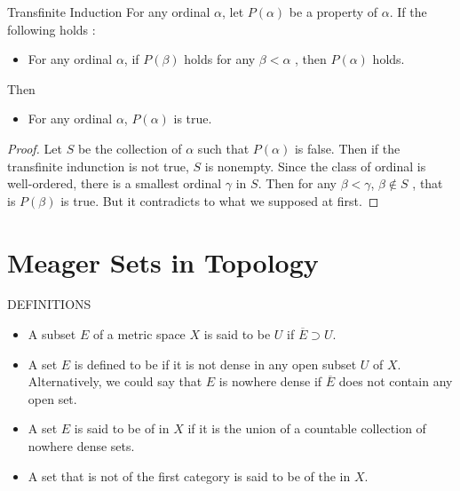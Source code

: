 \documentclass[../main.tex]{subfiles}
\begin{document}
\begin{theorem}{Transfinite Induction}{}
     For any ordinal \(  \alpha   \), let \(  P\left( \alpha  \right)   \) be a property of \(  \alpha   \). If the following holds : 
    \begin{itemize}
        \item For any ordinal \(  \alpha   \), if \(  P\left( \beta  \right)   \) holds for any \(  \beta < \alpha   \) , then \(  P\left( \alpha  \right)   \) holds.    
    \end{itemize}
       Then \begin{itemize}
        \item For any ordinal \(  \alpha   \), \(  P\left( \alpha  \right)   \) is true.  
       \end{itemize}
       
\end{theorem}

\begin{proof}
    Let \(  S  \) be the collection of \(  \alpha   \) such that \(  P\left( \alpha  \right)   \) is false. Then if the transfinite indunction is not true, \(  S  \) is nonempty. Since the class of ordinal is well-ordered, there is a smallest ordinal \(   \gamma   \) in \(  S  \). Then for any \(  \beta <  \gamma   \), \(  \beta \not \in S  \) , that is \(  P\left( \beta  \right)   \) is true.   But it contradicts to what we supposed at first.      
\end{proof}

\section{Meager Sets in Topology}
\begin{definition}{DEFINITIONS}{}
\begin{itemize}
    \item A subset $E$ of a metric space $X$ is said to be  $U$ if $\overline{E} \supset U$.
    \item  A set $E$ is defined to be  if it is not dense in any open subset $U$ of $X$. Alternatively, we could say that $E$ is nowhere dense if $\overline{E}$ does not contain any open set.
    \item A set $E$ is said to be of  in $X$ if it is the union of a countable collection of nowhere dense sets. 
    \item  A set that is not of the first category is said to be of the  in $X$.
\end{itemize}

\end{definition}
\end{document}

